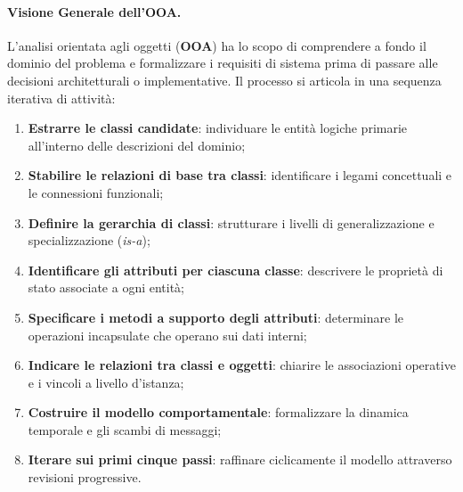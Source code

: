 \documentclass[12pt]{extarticle}
\begin{document}
\paragraph{Visione Generale dell'OOA.}
L'analisi orientata agli oggetti (\textbf{OOA}) ha lo scopo di comprendere a fondo il dominio del problema e formalizzare i requisiti di sistema prima di passare alle decisioni architetturali o implementative. Il processo si articola in una sequenza iterativa di attività:
\begin{enumerate}
    \item \textbf{Estrarre le classi candidate}: individuare le entità logiche primarie all'interno delle descrizioni del dominio;
    \item \textbf{Stabilire le relazioni di base tra classi}: identificare i legami concettuali e le connessioni funzionali;
    \item \textbf{Definire la gerarchia di classi}: strutturare i livelli di generalizzazione e specializzazione (\textit{is-a});
    \item \textbf{Identificare gli attributi per ciascuna classe}: descrivere le proprietà di stato associate a ogni entità;
    \item \textbf{Specificare i metodi a supporto degli attributi}: determinare le operazioni incapsulate che operano sui dati interni;
    \item \textbf{Indicare le relazioni tra classi e oggetti}: chiarire le associazioni operative e i vincoli a livello d'istanza;
    \item \textbf{Costruire il modello comportamentale}: formalizzare la dinamica temporale e gli scambi di messaggi;
    \item \textbf{Iterare sui primi cinque passi}: raffinare ciclicamente il modello attraverso revisioni progressive.
\end{enumerate}

\begin{figure}[htbp]
    \centering
{}
    \label{fig:ooa_process_steps}
\end{figure}
\end{document}
